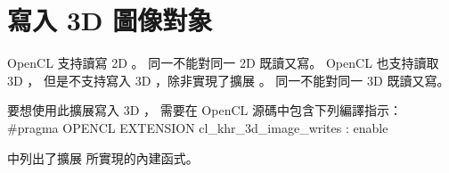 \section{寫入 3D 圖像對象}

OpenCL 支持讀寫 2D 。
同一不能對同一 2D 既讀又寫。
OpenCL 也支持讀取 3D ，
但是不支持寫入 3D ，除非實現了擴展 。
同一不能對同一 3D 既讀又寫。

要想使用此擴展寫入 3D ，
需要在 OpenCL 源碼中包含下列編譯指示：
\startclc
#pragma OPENCL EXTENSION cl_khr_3d_image_writes : enable
\stopclc

中列出了擴展  所實現的內建函式。

{}
